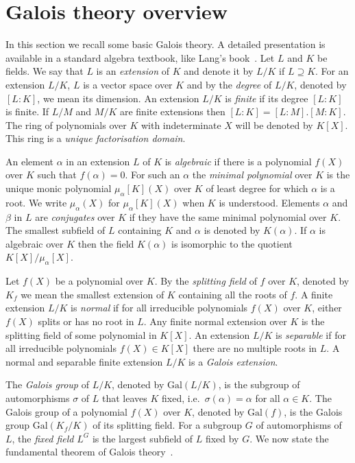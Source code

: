 \documentclass[prodmod,acmtalg]{acmsmall}
\newcommand{\Gal}[1]{{\ensuremath{\mathrm{Gal}\left(#1\right)}}}
\begin{document}
\section{Galois theory overview}

In this section we recall some basic Galois theory. A detailed
presentation is available in a standard algebra textbook, like Lang's
book~\cite{lang:algebra}. Let $L$ and $K$ be fields.  We say that $L$
is an \emph{extension} of $K$ and denote it by $L/K$ if $L \supseteq
K$. For an extension $L/K$, $L$ is a vector space over $K$ and by the
\emph{degree} of $L/K$, denoted by $[L:K]$, we mean its dimension. An
extension $L/K$ is \emph{finite} if its degree $[L:K]$ is finite. If
$L/M$ and $M/K$ are finite extensions then $[L:K] = [L:M].[M:K]$. The
ring of polynomials over $K$ with indeterminate $X$ will be denoted by
$K[X]$. This ring is a \emph{unique factorisation domain}.


An element $\alpha$ in an extension $L$ of $K$ is \emph{algebraic} if
there is a polynomial $f(X)$ over $K$ such that $f(\alpha)=0$. For
such an $\alpha$ the \emph{minimal polynomial} over $K$ is the unique
monic polynomial $\mu_\alpha[K](X)$ over $K$ of least degree for which
$\alpha$ is a root. We write $\mu_\alpha(X)$ for $\mu_\alpha[K](X)$
when $K$ is understood. Elements $\alpha$ and $\beta$ in $L$ are
\emph{conjugates} over $K$ if they have the same minimal polynomial
over $K$. The smallest subfield of $L$ containing $K$ and $\alpha$ is
denoted by $K(\alpha)$. If $\alpha$ is algebraic over $K$ then the
field $K(\alpha)$ is isomorphic to the quotient $K[X]/\mu_\alpha[X]$.

Let $f(X)$ be a polynomial over $K$. By the \emph{splitting field} of
$f$ over $K$, denoted by $K_f$ we mean the smallest extension of $K$
containing all the roots of $f$. A finite extension $L/K$ is
\emph{normal} if for all irreducible polynomials $f(X)$ over $K$,
either $f(X)$ splits or has no root in $L$. Any finite normal
extension over $K$ is the splitting field of some polynomial in
$K[X]$. An extension $L/K$ is \emph{separable} if for all irreducible
polynomials $f(X) \in K[X]$ there are no multiple roots in $L$.  A
normal and separable finite extension $L/K$ is a \emph{Galois
  extension}.



The \emph{Galois group} of $L/K$, denoted by $\Gal{L/K}$, is the
subgroup of automorphisms $\sigma$ of $L$ that leaves $K$ fixed, i.e.\
$\sigma(\alpha) = \alpha$ for all $\alpha \in K$. The Galois group of
a polynomial $f(X)$ over $K$, denoted by $\Gal{f}$, is the Galois
group $\Gal{K_f/K}$ of its splitting field. For a subgroup $G$ of
automorphisms of $L$, the \emph{fixed field} $L^G$ is the largest
subfield of $L$ fixed by $G$.  We now state the fundamental theorem of
Galois theory~\cite[Theorem 1.1, Chapter VI]{lang:algebra}.
\end{document}

